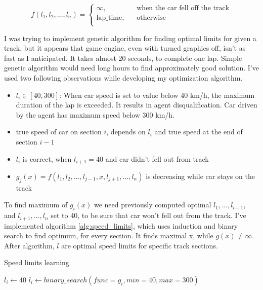 \documentclass[declaration,shortabstract,english,inz]{iithesis}
\begin{document}
$$ f(l_1, l_2, \dots, l_n ) =  \begin{cases}
    \infty, &\quad \text{when the car fell off the track}\\
    \text{lap\_time}, &\quad \text{otherwise} \\
  \end{cases}
 $$

I was trying to implement genetic algorithm for finding optimal limits for given a track, but it appears that game engine, even with turned graphics off, isn't as fast as I anticipated.
It takes almost 20 seconds, to complete one lap.
Simple genetic algorithm would need long hours to find approximately good solution.
I've used two following observations while developing my optimization algorithm.

\begin{itemize}
    \item  $l_i \in [40, 300]$: When car speed is set to value below 40 km/h, the maximum duration of the lap is exceeded. It results in agent disqualification. Car driven by the agent has maximum speed below 300 km/h.
    \item  true speed of car on section $i$, depends on $l_i$ and true speed at the end of section $i-1$
    \item
    $l_i$ is correct, when $l_{i+1} = 40$ and car didn't fell out from track
    \item  $g_j(x) = f(l_1,l_2, \dots,l_{j-1}, x, l_{j+1}, \dots, l_n)$ is decreasing while car stays on the track
    
\end{itemize}


To find maximum of $g_i(x)$ we need previously computed optimal $l_1, \dots, l_{i-1}$, and $l_{i+1}, \dots, l_n$ set to 40, to be sure that car won't fell out from the track. 
I've implemented algorithm \ref{alg:speed_limits}, which uses induction and binary search to find optimum, for every section. 
It finds maximal x, while $g(x) \neq \infty$.
After algorithm, $l$ are optimal speed limits for specific track sections.

\begin{algorithm}
    \caption{Speed limits learning}
    \label{alg:speed_limits}
    \begin{algorithmic}
            \STATE $l_i \gets 40$
        \ENDFOR
            \STATE $l_i \gets binary\_search(func=g_i, min=40, max=300)$
        \ENDFOR
    \end{algorithmic}
\end{algorithm}
\end{document}
